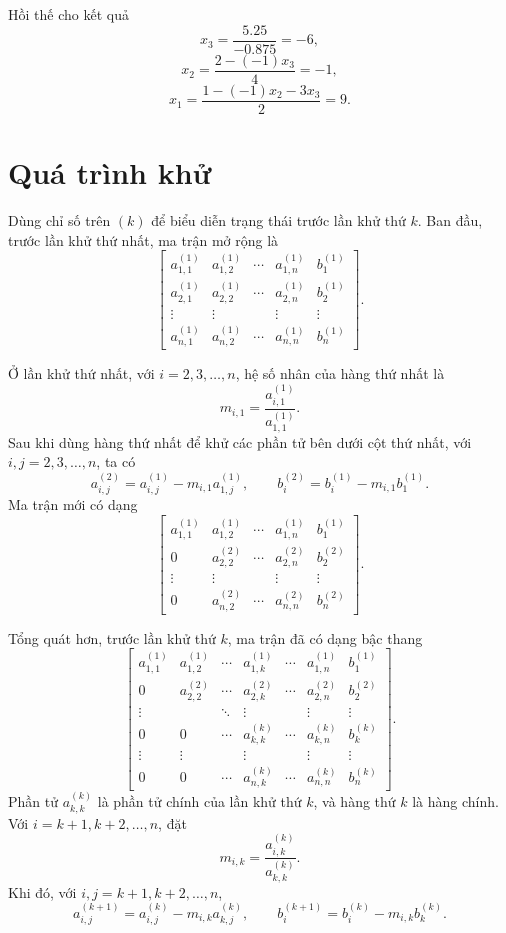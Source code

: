 \documentclass[11pt]{article}
\begin{document}
Hồi thế cho kết quả
\[
  x_3=\frac{5.25}{-0.875}=-6,
\]
\[
  x_2=\frac{2-(-1)x_3}{4}=-1,
\]
\[
  x_1=\frac{1-(-1)x_2-3x_3}{2}=9.
\]

\section{Quá trình khử}

Dùng chỉ số trên \((k)\) để biểu diễn trạng thái trước lần khử thứ \(k\). Ban
đầu, trước lần khử thứ nhất, ma trận mở rộng là
\[
\left[
\begin{array}{cccc|c}
a_{1,1}^{(1)} & a_{1,2}^{(1)} & \cdots & a_{1,n}^{(1)} & b_1^{(1)}\\
a_{2,1}^{(1)} & a_{2,2}^{(1)} & \cdots & a_{2,n}^{(1)} & b_2^{(1)}\\
\vdots        & \vdots        &        & \vdots        & \vdots\\
a_{n,1}^{(1)} & a_{n,2}^{(1)} & \cdots & a_{n,n}^{(1)} & b_n^{(1)}
\end{array}
\right].
\]

Ở lần khử thứ nhất, với \(i=2,3,\ldots,n\), hệ số nhân của hàng thứ nhất là
\[
  m_{i,1}=\frac{a_{i,1}^{(1)}}{a_{1,1}^{(1)}}.
\]
Sau khi dùng hàng thứ nhất để khử các phần tử bên dưới cột thứ nhất, với
\(i,j=2,3,\ldots,n\), ta có
\[
  a_{i,j}^{(2)}=a_{i,j}^{(1)}-m_{i,1}a_{1,j}^{(1)},
  \qquad
  b_i^{(2)}=b_i^{(1)}-m_{i,1}b_1^{(1)}.
\]
Ma trận mới có dạng
\[
\left[
\begin{array}{cccc|c}
a_{1,1}^{(1)} & a_{1,2}^{(1)} & \cdots & a_{1,n}^{(1)} & b_1^{(1)}\\
0             & a_{2,2}^{(2)} & \cdots & a_{2,n}^{(2)} & b_2^{(2)}\\
\vdots        & \vdots        &        & \vdots        & \vdots\\
0             & a_{n,2}^{(2)} & \cdots & a_{n,n}^{(2)} & b_n^{(2)}
\end{array}
\right].
\]

Tổng quát hơn, trước lần khử thứ \(k\), ma trận đã có dạng bậc thang
\[
\left[
\begin{array}{cccccc|c}
a_{1,1}^{(1)} & a_{1,2}^{(1)} & \cdots & a_{1,k}^{(1)}
  & \cdots & a_{1,n}^{(1)} & b_1^{(1)}\\
0 & a_{2,2}^{(2)} & \cdots & a_{2,k}^{(2)}
  & \cdots & a_{2,n}^{(2)} & b_2^{(2)}\\
\vdots & & \ddots & \vdots & & \vdots & \vdots\\
0 & 0 & \cdots & a_{k,k}^{(k)}
  & \cdots & a_{k,n}^{(k)} & b_k^{(k)}\\
\vdots & \vdots & & \vdots & & \vdots & \vdots\\
0 & 0 & \cdots & a_{n,k}^{(k)}
  & \cdots & a_{n,n}^{(k)} & b_n^{(k)}
\end{array}
\right].
\]
Phần tử \(a_{k,k}^{(k)}\) là phần tử chính của lần khử thứ \(k\), và hàng thứ
\(k\) là hàng chính. Với \(i=k+1,k+2,\ldots,n\), đặt
\[
  m_{i,k}=\frac{a_{i,k}^{(k)}}{a_{k,k}^{(k)}}.
\]
Khi đó, với \(i,j=k+1,k+2,\ldots,n\),
\[
  a_{i,j}^{(k+1)}
  =a_{i,j}^{(k)}-m_{i,k}a_{k,j}^{(k)},
  \qquad
  b_i^{(k+1)}
  =b_i^{(k)}-m_{i,k}b_k^{(k)}.
\]
\end{document}
